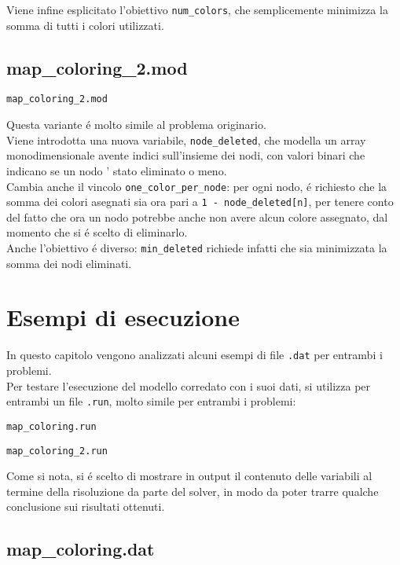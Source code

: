 \documentclass{article}
\begin{document}
Viene infine esplicitato l'obiettivo \texttt{num\_colors}, che semplicemente minimizza la somma di tutti i colori utilizzati.\\
\pagebreak

\subsection{map\_coloring\_2.mod}
\texttt{map\_coloring\_2.mod}


Questa variante \'e molto simile al problema originario.\\
Viene introdotta una nuova variabile, \texttt{node\_deleted}, che modella un array monodimensionale avente indici sull'insieme dei nodi, con valori binari che indicano se un nodo \e' stato eliminato o meno.\\

Cambia anche il vincolo \texttt{one\_color\_per\_node}: per ogni nodo, \'e richiesto che la somma dei colori asegnati sia ora pari a \texttt{1 - node\_deleted[n]}, per tenere conto del fatto che ora un nodo potrebbe anche non avere alcun colore assegnato, dal momento che si \'e scelto di eliminarlo.\\

Anche l'obiettivo \'e diverso: \texttt{min\_deleted} richiede infatti che sia minimizzata la somma dei nodi eliminati.\\
\pagebreak

\section{Esempi di esecuzione}
In questo capitolo vengono analizzati alcuni esempi di file \texttt{.dat} per entrambi i problemi.\\
Per testare l'esecuzione del modello corredato con i suoi dati, si utilizza per entrambi un file \texttt{.run}, molto simile per entrambi i problemi:

\texttt{map\_coloring.run}


\texttt{map\_coloring\_2.run}


Come si nota, si \'e scelto di mostrare in output il contenuto delle variabili al termine della risoluzione da parte del solver, in modo da poter trarre qualche conclusione sui risultati ottenuti.\\

\subsection{map\_coloring.dat}
\end{document}

